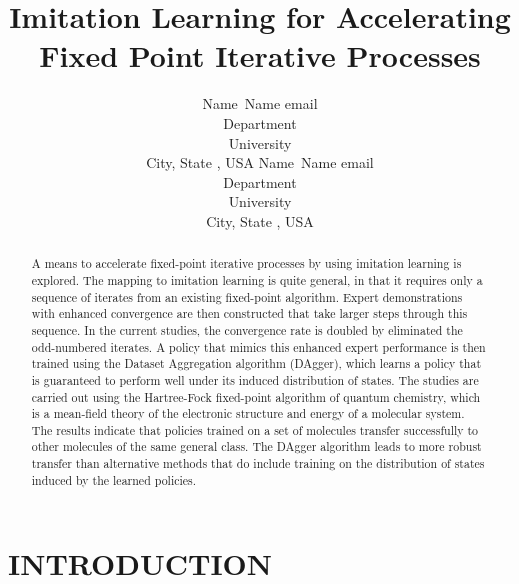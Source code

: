 \documentclass[twoside,11pt]{article}
\begin{document}
\title{Imitation Learning for Accelerating Fixed Point Iterative Processes}

\author{\name Name\ Name \email email \\
       \addr Department\\
       University \\
       City, State , USA
       \AND
       \name Name\ Name \email email \\
       \addr Department\\
       University \\
       City, State , USA}

\maketitle


\begin{abstract}
A means to accelerate fixed-point iterative processes by using imitation learning is explored. The mapping to imitation learning is quite general, in that it requires only a sequence of iterates from an existing fixed-point algorithm. Expert demonstrations with enhanced convergence are then constructed that take larger steps through this sequence. In the current studies, the convergence rate is doubled by eliminated the odd-numbered iterates. A policy that mimics this enhanced expert performance is then trained using the Dataset Aggregation algorithm (DAgger), which learns a policy that is guaranteed to perform well under its induced distribution of states. The studies are carried out using the Hartree-Fock fixed-point algorithm of quantum chemistry, which is a mean-field theory of the electronic structure and energy of a molecular system. The results indicate that policies trained on a set of molecules transfer successfully to other molecules of the same general class. The DAgger algorithm leads to more robust transfer than alternative methods that do include training on the distribution of states induced by the learned policies.
\end{abstract}

\section{INTRODUCTION}
\end{document}

